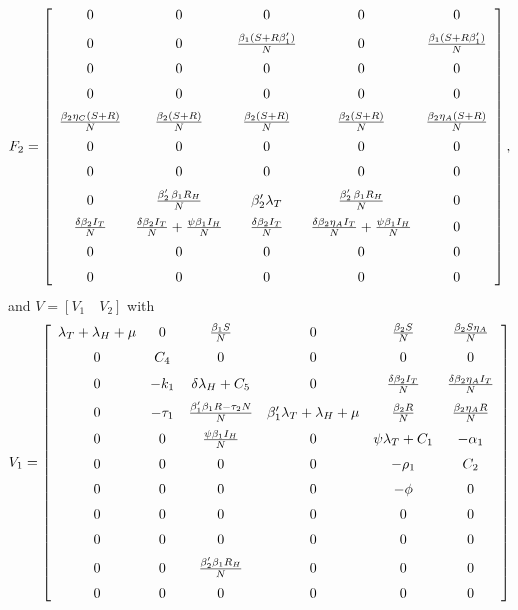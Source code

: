 \documentclass{my_aims}
\theoremstyle{definition}
\begin{document}
\begin{equation*}
F_2 = \left[ \begin {array}{ccccc}
0&0&0&0&0\\ \noalign{\medskip}
0&0&{\frac{\beta_1 (S + R \beta'_1)}{N}}
&0&{\frac{\beta_1(S+ R \beta'_1)}{N}}
\\ \noalign{\medskip}
0&0&0&0&0\\ \noalign{\medskip}
0&0&0&0&0\\ \noalign{\medskip}
{\frac{\beta_2 \eta_C(S + R)}{N}}&{\frac {\beta_2(S+R)}{N}}
&{\frac {\beta_2(S+R)}{N}}&{\frac {\beta_2(S+R)}{N}}
&{\frac{\beta_2 \eta_A (S+R)}{N}}\\ \noalign{\medskip}
0&0&0&0&0\\ \noalign{\medskip}
0&0&0&0&0\\ \noalign{\medskip}
0&{\frac{\beta'_2 \,\beta_1 R_H}{N}} &\beta'_2 \lambda_T
&{\frac{\beta'_2 \,\beta_1 R_H}{N}}&0\\ \noalign{\medskip}
{\frac{\delta \beta_2 I_T}{N}}&{\frac {\delta \beta_2 I_T}{N}}
+{\frac {\psi \beta_1 I_H}{N}}&\frac{\delta \beta_2 I_T}{N}
&{\frac{\delta \beta_2 \eta_A I_T}{N}}+{\frac {\psi \beta_1 I_H}{N}}&0\\
\noalign{\medskip} 0&0&0&0&0\\
\noalign{\medskip} 0&0&0&0&0
\end{array} \right],
\end{equation*}
and
$V = \left[ V_1 \quad V_2\right]$ with
\begin{equation*}
V_1 =  \left[ \begin {array}{cccccc}
\lambda_T + \lambda_H +\mu&0& {\frac{\beta_1 S}{N}}&0&{\frac{\beta_2 S}{N}}
&{\frac{\beta_2 S \eta_A}{N}}\\ \noalign{\medskip}
0& C_4 &0&0&0&0\\ \noalign{\medskip}
0&-k_1 &\delta \lambda_H + C_5 &0&
{\frac{\delta \beta_2 I_T}{N}}&{\frac{\delta \beta_2 \eta_A I_T}{N}}\\
\noalign{\medskip} 0&-\tau_1 & \frac{\beta'_1 \beta_1 R-\tau_2 N}{N}&\beta'_1 \lambda_T
+ \lambda_H +\mu&{\frac{\beta_2 R}{N}}&{\frac{\beta_2 \eta_A R}{N}}\\
\noalign{\medskip} 0&0&{\frac {\psi \beta_1 I_H}{N}}&0&\psi \lambda_T + C_1 &-\alpha_1\\
\noalign{\medskip} 0&0&0&0&-\rho_1 & C_2\\
\noalign{\medskip} 0&0&0&0&-\phi&0\\
\noalign{\medskip} 0&0&0&0&0&0\\
\noalign{\medskip} 0&0&0&0&0&0\\
\noalign{\medskip} 0&0&{\frac{\beta'_2 \beta_1 R_H}{N}}&0&0&0\\
\noalign{\medskip} 0&0&0&0&0&0
\end {array} \right]
\end{equation*}
\end{document}
